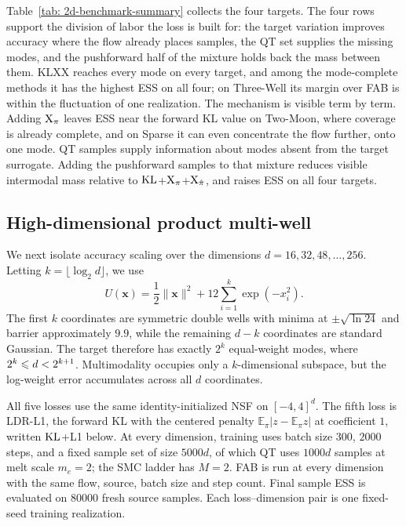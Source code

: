 \documentclass{article}
\begin{document}
Table~\ref{tab: 2d-benchmark-summary} collects the four targets. The four rows support the division of labor the loss is built for: the target variation improves accuracy where the flow already places samples, the QT set supplies the missing modes, and the pushforward half of the mixture holds back the mass between them. KLXX reaches every mode on every target, and among the mode-complete methods it has the highest ESS on all four; on Three-Well its margin over FAB is within the fluctuation of one realization. The mechanism is visible term by term. Adding $\mathrm{X}_\pi$ leaves ESS near the forward KL value on Two-Moon, where coverage is already complete, and on Sparse it can even concentrate the flow further, onto one mode. QT samples supply information about modes absent from the target surrogate. Adding the pushforward samples to that mixture reduces visible intermodal mass relative to $\mathrm{KL}$+$\mathrm{X}_\pi$+$\mathrm{X}_{\hat\pi}$, and raises ESS on all four targets.

\subsection{High-dimensional product multi-well}
\label{subsec: highd}

We next isolate accuracy scaling over the dimensions
$d=16,32,48,\ldots,256$. Letting $k=\lfloor\log_2 d\rfloor$, we use
\begin{equation}
    U(\mathbf{x})=\frac12\lVert\mathbf{x}\rVert^2
    +12\sum_{i=1}^{k}\exp(-x_i^2).
    \label{eq: highd-potential}
\end{equation}
The first $k$ coordinates are symmetric double wells with minima at $\pm\sqrt{\ln 24}$ and barrier approximately $9.9$, while the remaining $d-k$ coordinates are standard Gaussian. The target therefore has exactly $2^k$ equal-weight modes, where $2^k\leqslant d<2^{k+1}$. Multimodality occupies only a $k$-dimensional subspace, but the log-weight error accumulates across all $d$ coordinates.

All five losses use the same identity-initialized NSF on $[-4,4]^d$. The fifth loss is LDR-L1, the forward KL with the centered penalty $\mathbb E_\pi|z-\mathbb E_\pi z|$ at coefficient $1$, written $\mathrm{KL}$+L1 below. At every dimension, training uses batch size $300$, $2000$ steps, and a fixed sample set of size $5000d$, of which QT uses $1000d$ samples at melt scale $m_e=2$; the SMC ladder has $M=2$. FAB is run at every dimension with the same flow, source, batch size and step count. Final sample ESS is evaluated on $80000$ fresh source samples. Each loss--dimension pair is one fixed-seed training realization.
\end{document}
